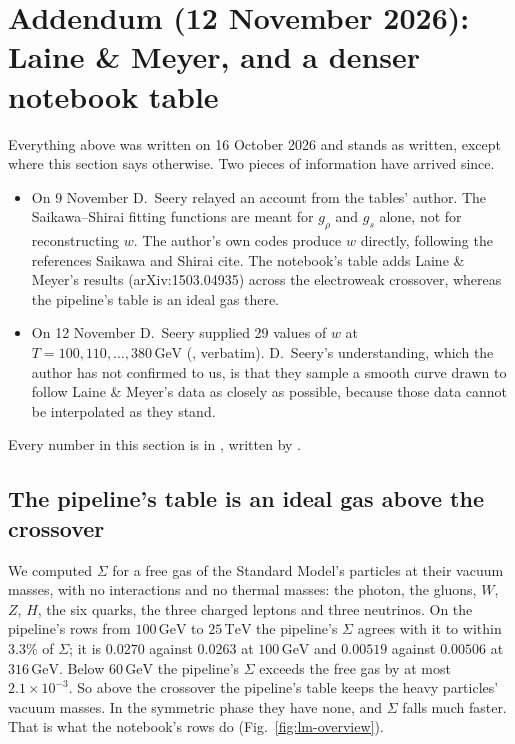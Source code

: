 \documentclass[11pt,a4paper]{article}
\newcommand{\GeV}{\,\mathrm{GeV}}
\begin{document}
\section{Addendum (12 November 2026): Laine \& Meyer, and a denser notebook table}
\label{sec:addendum}

Everything above was written on 16 October 2026 and stands as written, except where this section
says otherwise. Two pieces of information have arrived since.
\begin{itemize}
\item On 9 November D.~Seery relayed an account from the tables' author. The Saikawa--Shirai fitting
  functions are meant for $g_\rho$ and $g_s$ alone, not for reconstructing $w$. The author's own
  codes produce $w$ directly, following the references Saikawa and Shirai cite. The notebook's table
  adds Laine \& Meyer's results (arXiv:1503.04935) across the electroweak crossover, whereas the
  pipeline's table is an ideal gas there.
\item On 12 November D.~Seery supplied 29 values of $w$ at $T = 100, 110, \ldots, 380\GeV$
  (, verbatim). D.~Seery's understanding, which the author
  has not confirmed to us, is that they sample a smooth curve drawn to follow Laine \& Meyer's data as
  closely as possible, because those data cannot be interpolated as they stand.
\end{itemize}
Every number in this section is in , written by
.

\subsection{The pipeline's table is an ideal gas above the crossover}

We computed $\Sigma$ for a free gas of the Standard Model's particles at their vacuum masses, with no
interactions and no thermal masses: the photon, the gluons, $W$, $Z$, $H$, the six quarks, the three
charged leptons and three neutrinos. On the pipeline's rows from $100\GeV$ to $25\,\mathrm{TeV}$ the
pipeline's $\Sigma$ agrees with it to within $3.3\%$ of $\Sigma$; it is $0.0270$ against
$0.0263$ at $100\GeV$ and $0.00519$ against $0.00506$ at $316\GeV$. Below $60\GeV$ the pipeline's
$\Sigma$ exceeds the free gas by at most $2.1\times10^{-3}$. So above the crossover the pipeline's
table keeps the heavy particles' vacuum masses. In the symmetric phase they have none, and $\Sigma$
falls much faster. That is what the notebook's rows do (Fig.~\ref{fig:lm-overview}).
\end{document}
